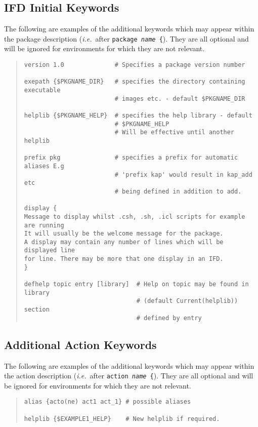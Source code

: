 \documentclass[twoside,11pt]{article}
\newcommand{\xlabel}[1]{}
\begin{document}
\subsection{\xlabel{ifd_initial_keywords}IFD Initial Keywords}
The following are examples of the additional keywords which may appear within
the package description (\textit{i.e.}\ after \texttt{package \textit{name}
\{}).
They are all optional and will be ignored for environments for which they are
not relevant.
\begin{quote} \begin{verbatim}
version 1.0              # Specifies a package version number

exepath {$PKGNAME_DIR}   # specifies the directory containing executable
                         # images etc. - default $PKGNAME_DIR

helplib {$PKGNAME_HELP}  # specifies the help library - default
                         # $PKGNAME_HELP
                         # Will be effective until another helplib

prefix pkg               # specifies a prefix for automatic aliases E.g
                         # 'prefix kap' would result in kap_add etc
                         # being defined in addition to add.

display {
Message to display whilst .csh, .sh, .icl scripts for example are running
It will usually be the welcome message for the package.
A display may contain any number of lines which will be displayed line
for line. There may be more that one display in an IFD.
}

defhelp topic entry [library]  # Help on topic may be found in library
                               # (default Current(helplib)) section
                               # defined by entry
\end{verbatim} \end{quote}

\subsection{\xlabel{additional_action_keywords}\label{add_act}Additional
Action Keywords}
The following are examples of the additional keywords which may appear within
the action description (\textit{i.e.}\ after \texttt{action \textit{name} \{}).
They are all optional and will be ignored for environments for which they are
not relevant.
\begin{quote} \begin{verbatim}
alias {acto(ne) act1 act_1} # possible aliases

helplib {$EXAMPLE1_HELP}    # New helplib if required.
\end{verbatim} \end{quote}
\end{document}
